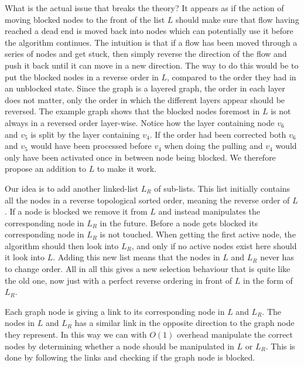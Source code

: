 What is the actual issue that breaks the theory? It appears as if the action of moving blocked nodes to the front of the list $L$ should
make sure that flow having reached a dead end is moved back into nodes which can potentially use it before the algorithm continues.
The intuition is that if a flow has been moved through a series of nodes and get stuck, then simply reverse the direction of the
flow and push it back until it can move in a new direction. The way to do this would be to put the blocked nodes in a reverse
order in $L$, compared to the order they had in an unblocked state. Since the graph is a layered graph, the order in each layer does not matter,
only the order in which the different layers appear should be reversed. 
The example graph shows that the blocked nodes foremost in $L$ is not always in a reversed order layer-wise. Notice how the layer containing node $v_6$ and $v_5$
is split by the layer containing $v_4$. If the order had been corrected both $v_6$ and $v_5$ would have been processed before $v_4$ when doing the pulling and 
$v_4$ would only have been activated once in between node being blocked. We therefore propose an addition to $L$ to make it work.

Our idea is to add another linked-list $L_R$ of sub-lists. This list initially contains all the nodes in a reverse topological sorted order,
meaning the reverse order of $L$. If a node is blocked we remove it from $L$ and instead manipulates the corresponding node in $L_R$ in the future.
Before a node gets blocked its corresponding node in $L_R$ is not touched.
When getting the first active node, the algorithm should then look into $L_R$, and only if no active nodes exist here should it look into $L$.
Adding this new list means that the nodes in $L$ and $L_R$ never has to change order. All in all this gives a new selection behaviour that
is quite like the old one, now just with a perfect reverse ordering in front of $L$ in the form of $L_R$.

Each graph node is giving a link to its corresponding node in $L$ and $L_R$. The nodes in $L$ and $L_R$ has a similar link in 
the opposite direction to the graph node they represent.
In this way we can with $O(1)$ overhead manipulate the correct nodes by determining whether a node should be manipulated in $L$ or $L_R$. 
This is done by following the links and checking if the graph node is blocked.

